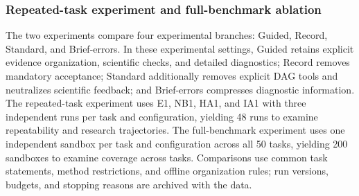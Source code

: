 \subsubsection{Repeated-task experiment and full-benchmark ablation}

The two experiments compare four experimental branches: Guided, Record, Standard, and Brief-errors. In these experimental settings, Guided retains explicit evidence organization, scientific checks, and detailed diagnostics; Record removes mandatory acceptance; Standard additionally removes explicit DAG tools and neutralizes scientific feedback; and Brief-errors compresses diagnostic information. The repeated-task experiment uses E1, NB1, HA1, and IA1 with three independent runs per task and configuration, yielding 48 runs to examine repeatability and research trajectories. The full-benchmark experiment uses one independent sandbox per task and configuration across all 50 tasks, yielding 200 sandboxes to examine coverage across tasks. Comparisons use common task statements, method restrictions, and offline organization rules; run versions, budgets, and stopping reasons are archived with the data.
